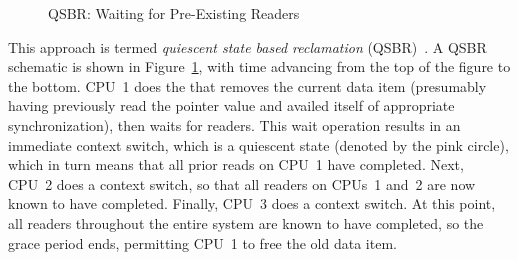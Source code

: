\begin{figure}
\centering
{}
\caption{QSBR: Waiting for Pre-Existing Readers}
\label{fig:defer:QSBR: Waiting for Pre-Existing Readers}
\end{figure}

This approach is termed \emph{quiescent state based reclamation}
(QSBR)~\cite{ThomasEHart2006a}.
A QSBR schematic is shown in
Figure~\ref{fig:defer:QSBR: Waiting for Pre-Existing Readers},
with time advancing from the top of the figure to the bottom.
CPU~1 does the  that removes the current data
item (presumably having previously read the pointer value and
availed itself of appropriate synchronization), then waits
for readers.
This wait operation results in an immediate context switch, which is a
quiescent state (denoted by the pink circle), which in turn means that
all prior reads on CPU~1 have completed.
Next, CPU~2 does a context switch, so that all readers on CPUs~1 and~2
are now known to have completed.
Finally, CPU~3 does a context switch.
At this point, all readers throughout the entire system are known to
have completed, so the grace period ends, permitting CPU~1 to free
the old data item.

